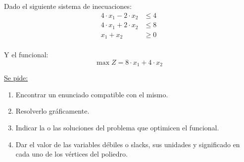 \documentclass[../main.tex]{subfiles}
\begin{document}
        \begin{exercise} %
            Dado el siguiente sistema de inecuaciones:
            \begin{equation}
                \begin{aligned}
                    4 \cdot x_1 - 2 \cdot x_2 &\leq 4 \\
                    4 \cdot x_1 + 2 \cdot x_2 &\leq 8 \\
                    x_1 + x_2 &\geq 0 \\
                \end{aligned}
            \end{equation}

            Y el funcional:
            \begin{equation}
                \max Z = 8 \cdot x_1 + 4 \cdot x_2 
            \end{equation}

            \underline{Se pide:}
            \begin{enumerate}[label=\alph*)]
                \item Encontrar un enunciado compatible con el mismo.
                \item Resolverlo gráficamente.
                \item Indicar la o las soluciones del problema que optimicen el funcional.
                \item Dar el valor de las variables débiles o slacks, sus unidades y significado en cada uno de los vértices del poliedro.
            \end{enumerate}


\end{exercise}
\end{document}
